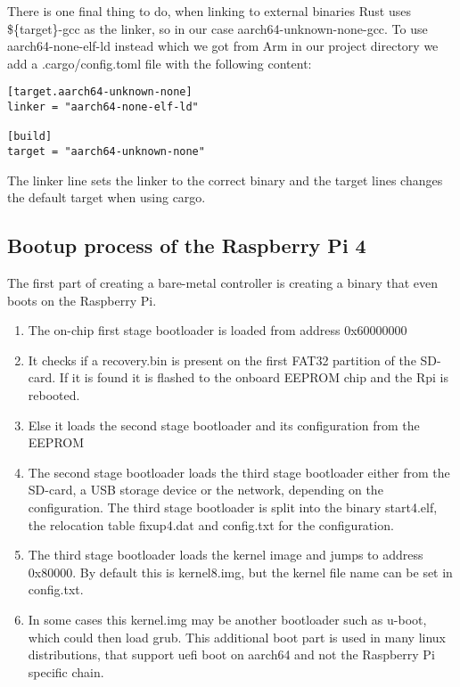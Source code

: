 There is one final thing to do, when linking to external binaries Rust uses \$\{target\}-gcc as the linker, so in our case aarch64-unknown-none-gcc.
To use aarch64-none-elf-ld instead which we got from Arm in our project directory we add a .cargo/config.toml file with the following content:
\begin{lstlisting}
[target.aarch64-unknown-none]
linker = "aarch64-none-elf-ld"

[build]
target = "aarch64-unknown-none"
\end{lstlisting}
The linker line sets the linker to the correct binary and the target lines changes the default target when using cargo.

\subsection{Bootup process of the Raspberry Pi 4}
\label{sec:concept_and_implementation:bare-metal:boot}

The first part of creating a bare-metal controller is creating a binary that even boots on the Raspberry Pi.
\begin{enumerate}
    \item The on-chip first stage bootloader is loaded from address 0x60000000
    \item It checks if a recovery.bin is present on the first FAT32 partition of the SD-card. If it is found it is flashed to the onboard EEPROM chip and the Rpi is rebooted.
    \item Else it loads the second stage bootloader and its configuration from the EEPROM
    \item The second stage bootloader loads the third stage bootloader either from the SD-card, a USB storage device or the network, depending on the configuration.
          The third stage bootloader is split into the binary start4.elf, the relocation table fixup4.dat and config.txt for the configuration.
    \item The third stage bootloader loads the kernel image and jumps to address 0x80000. By default this is kernel8.img, but the kernel file name can be set in config.txt.
    \item In some cases this kernel.img may be another bootloader such as u-boot, which could then load grub.
          This additional boot part is used in many linux distributions, that support uefi boot on aarch64 and not the Raspberry Pi specific chain.
\end{enumerate}

